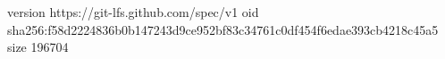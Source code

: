 version https://git-lfs.github.com/spec/v1
oid sha256:f58d2224836b0b147243d9ce952bf83c34761c0df454f6edae393cb4218c45a5
size 196704
